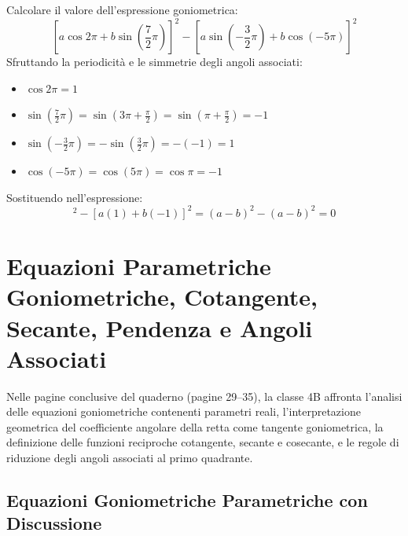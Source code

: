 \documentclass[11pt,a4paper,oneside]{report}
\begin{document}
\begin{esempio}
Calcolare il valore dell'espressione goniometrica:
\begin{equation}
\left[a\cos 2\pi + b\sin\left(\frac{7}{2}\pi\right)\right]^2 - \left[a\sin\left(-\frac{3}{2}\pi\right) + b\cos(-5\pi)\right]^2
\end{equation}
Sfruttando la periodicit\`a e le simmetrie degli angoli associati:
\begin{itemize}
\item $\cos 2\pi = 1$
\item $\sin\left(\frac{7}{2}\pi\right) = \sin\left(3\pi + \frac{\pi}{2}\right) = \sin\left(\pi + \frac{\pi}{2}\right) = -1$
\item $\sin\left(-\frac{3}{2}\pi\right) = -\sin\left(\frac{3}{2}\pi\right) = -(-1) = 1$
\item $\cos(-5\pi) = \cos(5\pi) = \cos\pi = -1$
\end{itemize}
Sostituendo nell'espressione:
\begin{equation}
[a(1) + b(-1)]^2 - [a(1) + b(-1)]^2 = (a - b)^2 - (a - b)^2 = 0
\end{equation}
\end{esempio}

\chapter{Equazioni Parametriche Goniometriche, Cotangente, Secante, Pendenza e Angoli Associati}

Nelle pagine conclusive del quaderno (pagine 29--35), la classe 4B affronta l'analisi delle equazioni goniometriche contenenti parametri reali, l'interpretazione geometrica del coefficiente angolare della retta come tangente goniometrica, la definizione delle funzioni reciproche cotangente, secante e cosecante, e le regole di riduzione degli angoli associati al primo quadrante.

\section{Equazioni Goniometriche Parametriche con Discussione}
\end{document}
